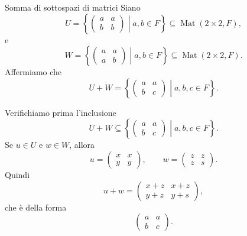 \documentclass[a4paper]{article}
\begin{document}
\begin{snippetexample}{Somma di sottospazi di matrici}
    Siano
    \[
        U=
        \left\{
            \begin{pmatrix}
                a & a\\
                b & b
            \end{pmatrix}
            \middle|
            a,b\in F
        \right\}
        \subseteq \operatorname{Mat}(2\times 2,F),
    \]
    e
    \[
        W=
        \left\{
            \begin{pmatrix}
                a & a\\
                a & b
            \end{pmatrix}
            \middle|
            a,b\in F
        \right\}
        \subseteq \operatorname{Mat}(2\times 2,F).
    \]
    Affermiamo che
    \[
        U+W
        =
        \left\{
            \begin{pmatrix}
                a & a\\
                b & c
            \end{pmatrix}
            \middle|
            a,b,c\in F
        \right\}.
    \]

    Verifichiamo prima l'inclusione
    \[
        U+W
        \subseteq
        \left\{
            \begin{pmatrix}
                a & a\\
                b & c
            \end{pmatrix}
            \middle|
            a,b,c\in F
        \right\}.
    \]
    Se \(u\in U\) e \(w\in W\), allora
    \[
        u=
        \begin{pmatrix}
            x & x\\
            y & y
        \end{pmatrix},
        \qquad
        w=
        \begin{pmatrix}
            z & z\\
            z & s
        \end{pmatrix}.
    \]
    Quindi
    \[
        u+w
        =
        \begin{pmatrix}
            x+z & x+z\\
            y+z & y+s
        \end{pmatrix},
    \]
    che è della forma
    \[
        \begin{pmatrix}
            a & a\\
            b & c
        \end{pmatrix}.
    \]


\end{snippetexample}
\end{document}
